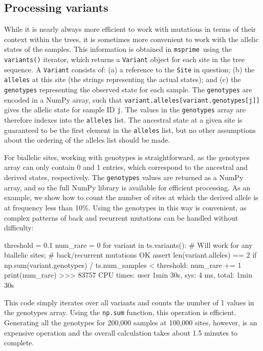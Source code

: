 \documentclass[graybox]{svmult}
\newcommand{\msprime}[0]{\texttt{msprime}}
\begin{document}
\subsection{Processing variants}\label{processing-variants}

While it is nearly always more efficient to work with mutations in terms
of their context within the trees, it is sometimes more convenient to
work with the allelic states of the samples. This information is
obtained in \msprime\ using the \texttt{variants()} iterator, which
returns a \texttt{Variant} object for each site in the tree sequence. A
\texttt{Variant} consists of: (a) a reference to the \texttt{Site} in question;
(b) the \texttt{alleles} at this site (the strings representing the
actual states); and (c) the \texttt{genotypes} representing the observed
state for each sample. The \texttt{genotypes} are encoded in a NumPy
array, such that
\texttt{variant.alleles[variant.genotypes[j]]}
gives the allelic state for sample ID \texttt{j}. The values in the
\texttt{genotypes} array are therefore indexes into the \texttt{alleles}
list. The ancestral state at a given site is guaranteed to be the first
element in the \texttt{alleles} list, but no other assumptions about
the ordering of the alleles list should be made.

For biallelic sites, working with genotypes is straightforward, as the
genotypes array can only contain 0 and 1 entries, which correspond to
the ancestral and derived states, respectively. The \texttt{genotypes}
values are returned as a NumPy array, and so the full NumPy library is
available for efficient processing. As an example, we show how to
count the number of sites at which the derived allele is at frequency
less than 10\%. Using the genotypes in this way is convenient, as
complex patterns of back and recurrent mutations can be handled without
difficulty:

\begin{pythoncode}
threshold = 0.1
num_rare = 0
for variant in ts.variants():
    # Will work for any biallelic sites;
    # back/recurrent mutations OK
    assert len(variant.alleles) == 2
    if np.sum(variant.genotypes) / ts.num_samples < threshold:
        num_rare += 1
print(num_rare)
>>> 83757
CPU times: user 1min 30s, sys: 4 ms, total: 1min 30s
\end{pythoncode}

This code simply iterates over all variants and
counts the number of 1 values in the genotypes array. Using the \texttt{np.sum}
function, this operation is efficient. Generating all the genotypes for
200,000 samples at 100,000 sites, however,
is an expensive operation and the overall calculation takes about 1.5 minutes
to complete.
\end{document}
